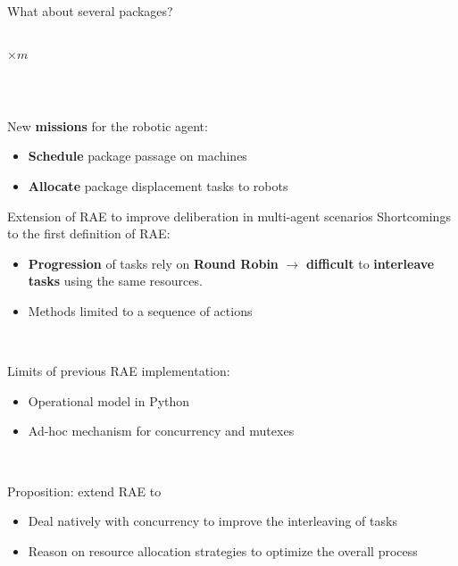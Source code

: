\begin{frame}{What about several packages?}
\begin{columns}
\begin{column}{0.5\textwidth}
            \LARGE $\times m$
        \end{column}
    \end{columns}
    
    ~
\pause

    New \textbf{missions} for the robotic agent:
    \begin{itemize}
        \pause
        \item \textbf{Schedule} package passage on machines
        \pause
        \item \textbf{Allocate} package displacement tasks to robots
    \end{itemize}

    \centering
\end{frame}

\begin{frame}{Extension of RAE to improve deliberation in multi-agent scenarios}
    Shortcomings to the first definition of RAE:
    {\small
    \begin{itemize}
        \pause
        \item \textbf{Progression} of tasks rely on \textbf{Round Robin} \pause$\rightarrow$ \textbf{difficult} to \textbf{interleave tasks} using the same resources.
        \pause
        \item Methods limited to a sequence of actions
    \end{itemize}}

    ~~

    \pause
    Limits of previous RAE implementation:
    {\small
    \begin{itemize}
        \item Operational model in Python
        \item Ad-hoc mechanism for concurrency and mutexes
    \end{itemize}}
    ~~
    
\pause
    Proposition: extend RAE to
    {\small
    \begin{itemize}
        \pause
        \item Deal natively with concurrency to improve the interleaving of tasks
        \pause
        \item Reason on resource allocation strategies to optimize the overall process
    \end{itemize}}
\end{frame}